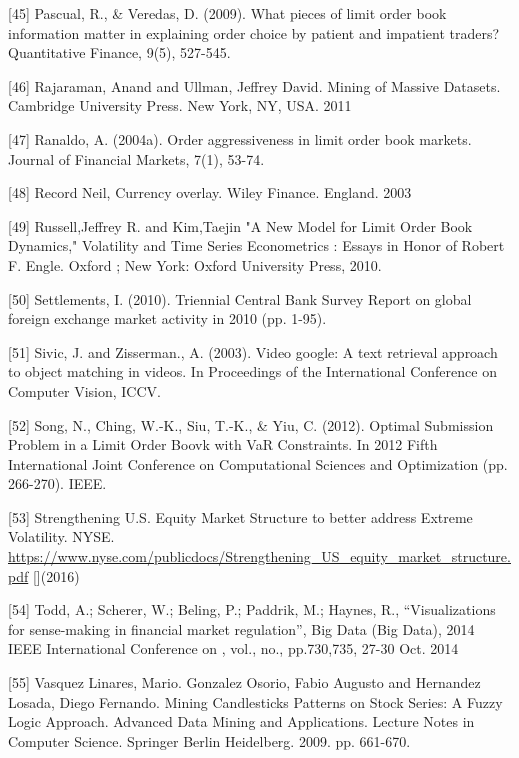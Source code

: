 \documentclass{beamer}
\begin{document}
\begin{thebibliography}{X}
 [45] Pascual, R., & Veredas, D. (2009). What pieces of limit order book information matter in explaining order choice by patient and impatient traders? Quantitative Finance, 9(5), 527-545. 

  [46] Rajaraman, Anand and Ullman, Jeffrey David. Mining of Massive Datasets. Cambridge University Press. New York, NY, USA. 2011

 [47] Ranaldo, A. (2004a). Order aggressiveness in limit order book markets. Journal of Financial Markets, 7(1), 53-74. 

 [48] Record Neil, Currency overlay. Wiley Finance. England. 2003

 [49] Russell,Jeffrey R. and Kim,Taejin "A New Model for Limit Order Book Dynamics," Volatility and Time Series Econometrics : Essays in Honor of Robert F. Engle. Oxford ; New York: Oxford University Press, 2010.

 [50] Settlements, I. (2010). Triennial Central Bank Survey Report on global foreign exchange market activity in 2010 (pp. 1-95).

 [51] Sivic, J. and Zisserman., A. (2003). Video google: A text retrieval approach to object matching in videos. In Proceedings of the International Conference on Computer Vision, ICCV.

 [52] Song, N., Ching, W.-K., Siu, T.-K., & Yiu, C. (2012). Optimal Submission Problem in a Limit Order Boovk with VaR Constraints. In 2012 Fifth International Joint Conference on Computational Sciences and Optimization (pp. 266-270). IEEE. 

 [53] Strengthening U.S. Equity Market Structure to better address Extreme Volatility. NYSE. \url{https://www.nyse.com/publicdocs/Strengthening\_US\_equity\_market\_structure.pdf} [](2016)

 [54] Todd, A.; Scherer, W.; Beling, P.; Paddrik, M.; Haynes, R., "`Visualizations for sense-making in financial market regulation"', Big Data (Big Data), 2014 IEEE International Conference on , vol., no., pp.730,735, 27-30 Oct. 2014

 [55] Vasquez Linares, Mario. Gonzalez Osorio, Fabio Augusto and Hernandez Losada, Diego Fernando. Mining Candlesticks Patterns on Stock Series: A Fuzzy Logic Approach. Advanced Data Mining and Applications. Lecture Notes in Computer Science. Springer Berlin Heidelberg. 2009. pp. 661-670.


\end{thebibliography}
\end{document}
